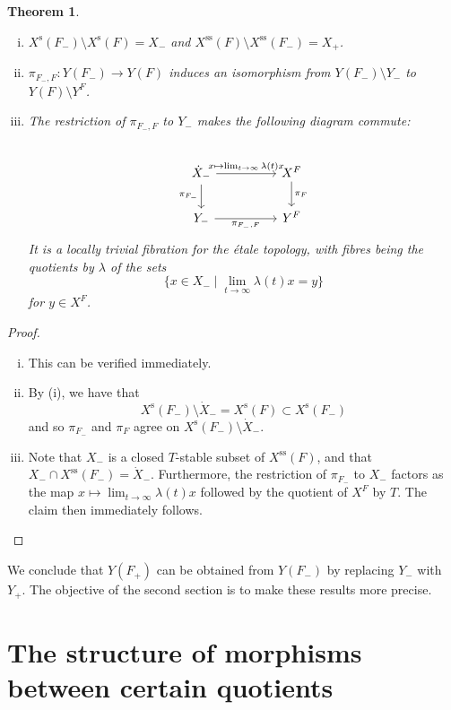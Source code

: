 \documentclass{article}
\theoremstyle{plain}
\newtheorem*{theorem}{Theorem}
\theoremstyle{definition}
\newcommand{\s}{\mathrm{s}}
\renewcommand{\ss}{\mathrm{ss}}
\newcommand{\oldpage}[1]{\marginpar{\footnotesize$\Big\vert$ \textit{p.~#1}}}
\begin{document}
\oldpage{517}
\begin{theorem}
  \begin{enumerate}[(i)]
    \item $X^\s(F_-)\setminus X^\s(F)=X_-$ and $X^\ss(F)\setminus X^\ss(F_-)=X_+$.
    \item $\pi_{F_-,F}\colon Y(F_-)\to Y(F)$ induces an isomorphism from $Y(F_-)\setminus Y_-$ to $Y(F)\setminus Y^F$.
    \item The restriction of $\pi_{F_-,F}$ to $Y_-$ makes the following diagram commute:
      \[
        \begin{tikzcd}[column sep=huge]
        \\\dot{X}_- \rar["x\mapsto\lim_{t\to\infty}\lambda(t)x"] \dar[swap,"\pi_{F_-}"]
          & X^F \dar["\pi_F"]
        \\Y_- \rar[swap,"\pi_{F_-,F}"]
          & Y^F
        \end{tikzcd}
      \]
      It is a locally trivial fibration for the \'{e}tale topology, with fibres being the quotients by $\lambda$ of the sets
      \[
        \big\{x\in X_-\mid\lim_{t\to\infty}\lambda(t)x=y\big\}
      \]
      for $y\in X^F$.
  \end{enumerate}
\end{theorem}

\begin{proof}
  \begin{enumerate}[(i)]
    \item This can be verified immediately.
    \item By (i), we have that
      \[
        X^\s(F_-)\setminus\dot{X}_- = X^\s(F) \subset X^\s(F_-)
      \]
      and so $\pi_{F_-}$ and $\pi_F$ agree on $X^\s(F_-)\setminus\dot{X}_-$.
    \item Note that $X_-$ is a closed $T$-stable subset of $X^\ss(F)$, and that $X_-\cap X^\ss(F_-)=\dot{X}_-$.
      Furthermore, the restriction of $\pi_{F_-}$ to $X_-$ factors as the map $x\mapsto\lim_{t\to\infty}\lambda(t)x$ followed by the quotient of $X^F$ by $T$.
      The claim then immediately follows.
  \end{enumerate}
\end{proof}

We conclude that $Y(F_+)$ can be obtained from $Y(F_-)$ by replacing $Y_-$ with $Y_+$.
The objective of the second section is to make these results more precise.


\section{The structure of morphisms between certain quotients}
\label{2}
\end{document}
